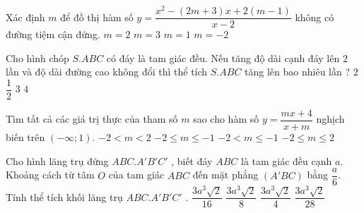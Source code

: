\begin{ex}%
Xác định $m$ để đồ thị hàm số
$y=\dfrac{x^2-(2m+3)x+2(m-1)}{x-2}$ không có đường tiệm cận đứng.
\choice
{$m=2$}
{ $m=3$}
{$m=1$}
{\True $m=-2$}
\end{ex}
\begin{ex}%
Cho hình chóp $S.ABC$ có đáy là tam giác đều. Nếu tăng độ dài cạnh đáy lên $2$ lần và độ dài
đường cao không đổi thì thể tích $S.ABC$ tăng lên bao nhiêu lần ?
\choice
{$2$}
{ $\dfrac{1}{2}$}
{$3$}
{\True $4$}
\end{ex}
\begin{ex}%
Tìm tất cả các giá trị thực của tham số $m$ sao cho hàm số $y=\dfrac{mx+4}{x+m}$ nghịch biến trên $(-\infty;1).$
\choice
{$-2<m<2$}
{ $-2\leq m\leq -1$}
{\True$-2<m\leq -1$}
{ $-2\leq m\leq 2$}
\end{ex}
\begin{ex}%
Cho hình lăng trụ đứng $ABC.A'B'C'$ , biết đáy $ABC$ là tam giác đều cạnh $a.$ Khoảng cách
từ tâm $O$ của tam giác $ABC$ đến mặt phẳng $(A'BC)$ bằng
$\dfrac{a}{6}$. Tính thể tích khối lăng trụ $ABC.A'B'C'$ .
\choice
{\True $\dfrac{3a^3\sqrt{2}}{16}$}
{ $\dfrac{3a^3\sqrt{2}}{8}$}
{$\dfrac{3a^3\sqrt{2}}{4}$}
{ $\dfrac{3a^3\sqrt{2}}{28}$}
\end{ex}
